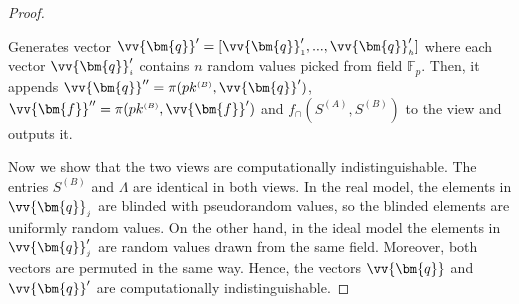 \begin{proof}
\begin{packed_enum}
%
%
%


\item Generates  vector $\vv{\bm{q}}'=[\vv{\bm{q}}'_{\scriptscriptstyle 1}, ...,  \vv{\bm{q}}'_{\scriptscriptstyle h}]$  where each vector $\vv{\bm{q}}'_{\scriptscriptstyle i}$ contains $n$ random values picked from  field $\mathbb{F}_p$. Then, it appends  $\vv{\bm{q}}''=\pi(pk^{\scriptscriptstyle (B)},\vv{\bm{q}}')$, $\vv{\bm{f}}''=\pi(pk^{\scriptscriptstyle (B)},\vv{\bm{f}}')$ and $f_{\scriptscriptstyle \cap}(S^{\scriptscriptstyle (A)},S^{\scriptscriptstyle (B)})$ to the view and outputs it.



%
%


\end{packed_enum}






Now we show that the two views are computationally indistinguishable. The entries $S^{\scriptscriptstyle (B)}$ and $\Lambda$ are identical in both views.  In the real model, the elements in $\vv{\bm{q}}_{\scriptscriptstyle j}$ are blinded with pseudorandom values, so the blinded elements are uniformly random  values. On the other hand, in the ideal model the elements in $\vv{\bm{q}}'_{\scriptscriptstyle j}$ are random values drawn from the same field. Moreover, both vectors are permuted in the same way. Hence, the vectors $\vv{\bm{q}}$ and  $\vv{\bm{q}}'$ are computationally indistinguishable. 



\end{proof}

